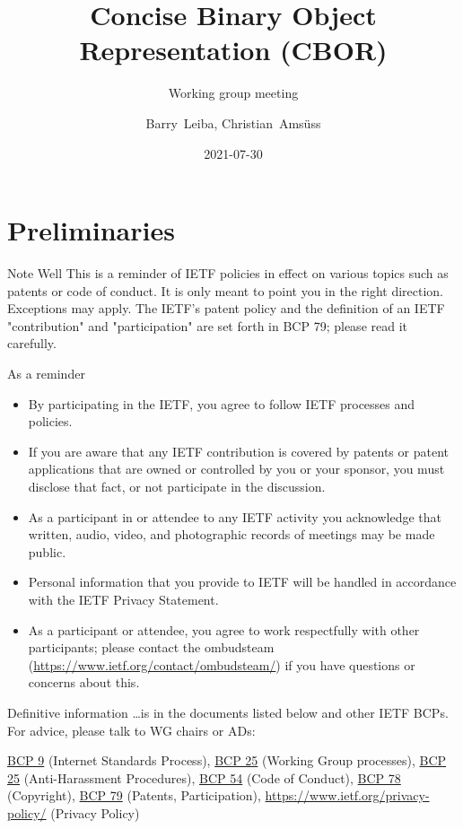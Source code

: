\documentclass[aspectratio=169]{beamer}
\title{Concise Binary Object Representation (CBOR)}
\subtitle{Working group meeting}
\author{Barry~Leiba, Christian~Amsüss}
\institute{\normalsize{\theietf, virtual San Francisco}}
\date{2021-07-30}
\begin{document}
\frame{\titlepage}

\section*{Preliminaries}

\begin{frame}{Note Well}\scriptsize
This is a reminder of IETF policies in effect on various topics such as patents or code of conduct. It is only meant to point you in the right direction. Exceptions may apply. The IETF's patent policy and the definition of an IETF "contribution" and "participation" are set forth in BCP 79; please read it carefully.

	\begin{block}{\small As a reminder\qquad\mbox{}}

	\vspace{-1.65em}

	\begin{itemize}
		\item By participating in the IETF, you agree to follow IETF processes and policies.
		\item If you are aware that any IETF contribution is covered by patents or patent applications that are owned or controlled by you or your sponsor, you must disclose that fact, or not participate in the discussion.
		\item As a participant in or attendee to any IETF activity you acknowledge that written, audio, video, and photographic records of meetings may be made public.
		\item Personal information that you provide to IETF will be handled in accordance with the IETF Privacy Statement.
		\item As a participant or attendee, you agree to work respectfully with other participants; please contact the ombudsteam (\url{https://www.ietf.org/contact/ombudsteam/}) if you have questions or concerns about this.
	\end{itemize}

	\end{block}

	\vspace{-1em}
	\begin{block}{\small Definitive information}
\ldots is in the documents listed below and other IETF BCPs. For advice, please talk to WG chairs or ADs:

\href{https://www.rfc-editor.org/info/bcp9}{BCP 9} (Internet Standards Process),
\href{https://www.rfc-editor.org/info/bcp25}{BCP 25} (Working Group processes),
\href{https://www.rfc-editor.org/info/bcp25}{BCP 25} (Anti-Harassment Procedures),
\href{https://www.rfc-editor.org/info/bcp54}{BCP 54} (Code of Conduct),
\href{https://www.rfc-editor.org/info/bcp78}{BCP 78} (Copyright),
\href{https://www.rfc-editor.org/info/bcp79}{BCP 79} (Patents, Participation),
\url{https://www.ietf.org/privacy-policy/} (Privacy Policy)
	\end{block}
\end{frame}
\end{document}
